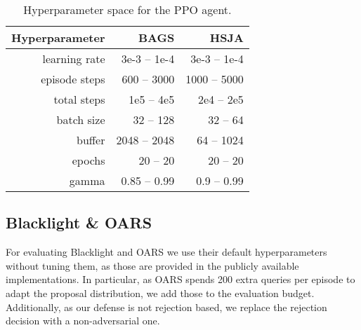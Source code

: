\begin{table}[t!]
\centering
\renewcommand*{\arraystretch}{1.05}
\caption{Hyperparameter space for the PPO agent.}
\begin{tabular}{|r|r|r|}
\toprule
\textbf{Hyperparameter} &\bf BAGS &\bf HSJA\\
\midrule
learning rate & 3e-3 -- 1e-4 & 3e-3 -- 1e-4 \\
episode steps & 600 -- 3000 & 1000 -- 5000 \\
total steps & 1e5 -- 4e5 & 2e4 -- 2e5\\
batch size & 32 -- 128 & 32 -- 64\\
buffer & 2048 -- 2048 & 64 -- 1024 \\
epochs & 20 -- 20 & 20 -- 20 \\
gamma & 0.85 -- 0.99 & 0.9 -- 0.99\\
\bottomrule
\end{tabular}
\label{tbl:agents}
\end{table}

\subsection{Blacklight \& OARS}

For evaluating Blacklight \cite{li2022blacklight} and OARS \cite{feng2023stateful} we use their default hyperparameters without tuning them, as those are provided in the publicly available implementations.
In particular, as OARS spends 200 extra queries per episode to adapt the proposal distribution, we add those to the evaluation budget.
Additionally, as our defense is not rejection based, we replace the rejection decision with a non-adversarial one.

